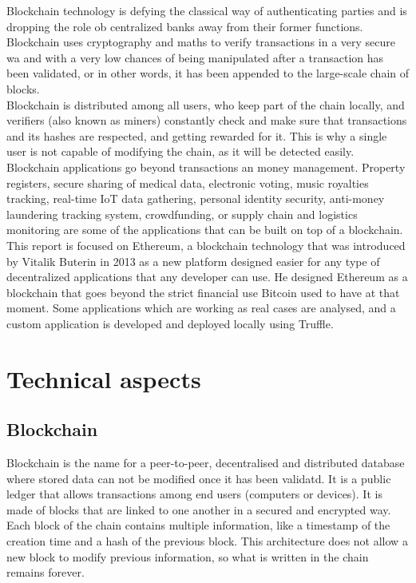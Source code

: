 \documentclass[10pt]{article}
\begin{document}
\begin{multicols}{2}
Blockchain technology is defying the classical way of authenticating parties and is dropping the role ob centralized banks away from their former functions. Blockchain uses cryptography and maths to verify transactions in a very secure wa and with a very low chances of being manipulated after a transaction has been validated, or in other words, it has been appended to the large-scale chain of blocks.\\

Blockchain is distributed among all users, who keep part of the chain locally, and verifiers (also known as miners) constantly check and make sure that transactions and its hashes are respected, and getting rewarded for it. This is why a single user is not capable of modifying the chain, as it will be detected easily.\\

Blockchain applications go beyond transactions an money management. Property registers, secure sharing of medical data, electronic voting, music royalties tracking, real-time IoT data gathering, personal identity security, anti-money laundering tracking system, crowdfunding, or supply chain and logistics monitoring are some of the applications that can be built on top of a blockchain.\\

This report is focused on Ethereum, a blockchain technology that was introduced by Vitalik Buterin in 2013 as a new platform designed easier for any type of decentralized applications that any developer can use. He designed Ethereum as a blockchain that goes beyond the strict financial use Bitcoin used to have at that moment. Some applications which are working as real cases are analysed, and a custom application is developed and deployed locally using Truffle.

\section{Technical aspects}

\subsection{Blockchain}

Blockchain is the name for a peer-to-peer, decentralised and distributed database where stored data can not be modified once it has been validatd. It is a public ledger that allows transactions among end users (computers or devices). It is made of blocks that are linked to one another in a secured and encrypted way. Each block of the chain contains multiple information, like a timestamp of the creation time and a hash of the previous block. This architecture does not allow a new block to modify previous information, so what is written in the chain remains forever.\\


\end{multicols}
\end{document}
